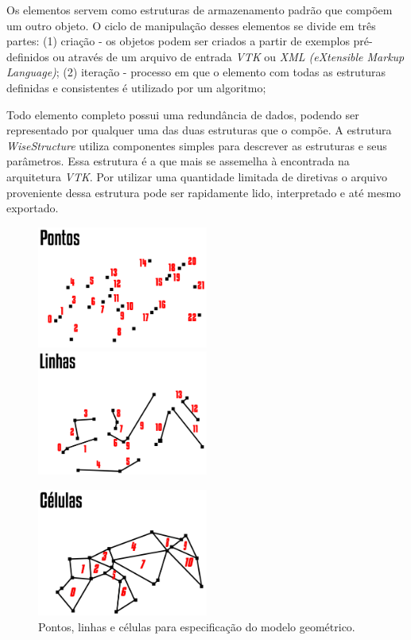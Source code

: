 Os elementos servem como estruturas de armazenamento padrão que compõem um outro objeto. O ciclo de manipulação desses elementos se divide em três partes: (1) criação - os objetos podem ser criados a partir de exemplos pré-definidos ou através de um arquivo de entrada \textit{VTK} ou \textit{XML (eXtensible Markup Language)}; (2) iteração - processo em que o elemento com todas as estruturas definidas e consistentes é utilizado por um algoritmo; 

Todo elemento completo possui uma redundância de dados, podendo ser representado por qualquer uma das duas estruturas que o compõe. A estrutura \textit{WiseStructure} utiliza componentes simples para descrever as estruturas e seus parâmetros. Essa estrutura é a que mais se assemelha à encontrada na arquitetura \textit{VTK}. Por utilizar uma quantidade limitada de diretivas o arquivo proveniente dessa estrutura pode ser rapidamente lido, interpretado e até mesmo exportado.

\begin{figure}[!htbp]
	\includegraphics[width=0.5\textwidth]{Figures/WiseElementPoints@16x.png}
	\includegraphics[width=0.5\textwidth]{Figures/WiseElementLines@16x.png}
	
	\includegraphics[width=0.5\textwidth]{Figures/WiseElementCells@16x.png}
	\caption{Pontos, linhas e células para especificação do modelo geométrico.}
	\label{fig2:wiselementstructs}
\end{figure}

